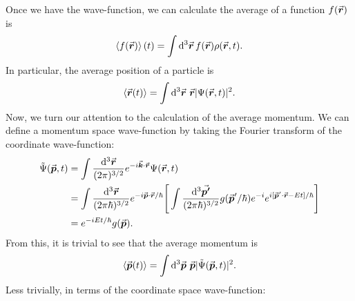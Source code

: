 Once we have the wave-function, we can calculate the average of a function $f(\va*{r})$ is
\begin{eqnarray}
    \expval{f(\va*{r})}(t) = \int \dd[3]{\va*{r}} f(\va*{r}) \rho(\va*{r},t)
.\end{eqnarray}
In particular, the average position of a particle is
\begin{eqnarray}
    \expval{\va*{r}(t)} = \int \dd[3]{\va*{r}} \, \va*{r} |\Psi(\va*{r},t)|^2
.\end{eqnarray}
Now, we turn our attention to the calculation of the average momentum.
We can define a momentum space wave-function by taking the Fourier transform of the coordinate wave-function:
\begin{eqnarray}
    \begin{aligned}
        \tilde{\Psi}(\va*{p},t) &= \int \frac{\dd[3]{\va*{r}}}{(2 \pi)^{3/2}} e^{-i \va*{k} \cdot \va*{r}} \Psi(\va*{r},t) \\
                                &= \int \frac{\dd[3]{\va*{r}}}{(2 \pi \hbar)^{3/2}} e^{-i \va*{p} \cdot \va*{r} / \hbar} \Bigg[ \int \frac{\dd[3]{\va*{p'}}}{(2 \pi \hbar)^{3/2}} g(\va*{p}' / \hbar) e^{-i } e^{i[ \va*{p}' \cdot \va*{r} - E t ] / \hbar} \Bigg] \\
                                &= e^{-i E t / \hbar} g(\va*{p})
    .\end{aligned}
\end{eqnarray}
From this, it is trivial to see that the average momentum is
\begin{eqnarray}
    \expval{\va*{p}(t)} = \int \dd[3]{\va*{p}} \, \va*{p} | \tilde{\Psi}(\va*{p},t) |^2
.\end{eqnarray}
Less trivially, in terms of the coordinate space wave-function:
